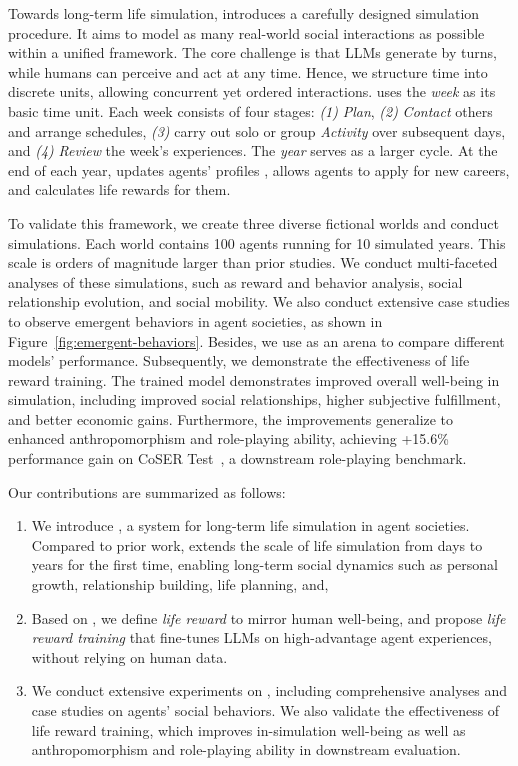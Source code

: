 Towards long-term life simulation,
\method introduces a carefully designed simulation procedure.
It aims to model as many real-world social interactions as possible within a unified framework.
The core challenge is that LLMs generate by turns, 
while humans can perceive and act at any time.
Hence, we structure time into discrete units, allowing concurrent yet ordered interactions.
\method uses the \textit{week} as its basic time unit.
Each week consists of four stages:
\textit{(1)} \textit{Plan},
\textit{(2)} \textit{Contact} others and arrange schedules,
\textit{(3)} carry out solo or group \textit{Activity} over subsequent days,
and \textit{(4)} \textit{Review} the week's experiences.
The \textit{year} serves as a larger cycle.
At the end of each year, 
\method updates agents' profiles , 
allows agents to apply for new careers, 
and calculates life rewards for them.


To validate this framework,
we create three diverse fictional worlds and conduct simulations.
Each world contains 100 agents running for 10 simulated years.
This scale is orders of magnitude larger than prior studies.
We conduct multi-faceted analyses of these simulations,
such as reward and behavior analysis,
social relationship evolution,
and social mobility.
We also conduct extensive case studies to observe emergent behaviors in agent societies, as shown in Figure~\ref{fig:emergent-behaviors}.
Besides, we use \method as an arena to compare different models' performance.
Subsequently, we demonstrate the effectiveness of life reward training.
The trained model demonstrates improved overall well-being in simulation,
including improved social relationships, higher subjective fulfillment, and better economic gains.
Furthermore, the improvements generalize to enhanced anthropomorphism and role-playing ability,
achieving +15.6\% performance gain on CoSER Test~\citep{wang2025coser}, a downstream role-playing benchmark.


Our contributions are summarized as follows:
\begin{enumerate}
  \item We introduce \method, a system for long-term life simulation in agent societies.
        Compared to prior work,
        \method extends the scale of life simulation from days to years for the first time,
        enabling long-term social dynamics 
        such as personal growth, relationship building, life planning, and, \etc
  \item Based on \method, we define \textit{life reward} to mirror human well-being, and propose \textit{life reward training} that fine-tunes LLMs on high-advantage agent experiences, without relying on human data.
       
  \item We conduct extensive experiments on \method,
        including comprehensive analyses and case studies on agents' social behaviors.
        We also validate the effectiveness of life reward training,
        which improves in-simulation well-being
        as well as anthropomorphism and role-playing ability in downstream evaluation.
\end{enumerate}

